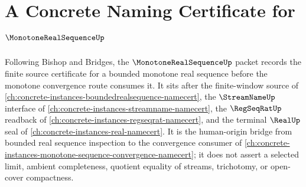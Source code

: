 \chapter{A Concrete Naming Certificate for $\MonotoneRealSequenceUp$}
\label{ch:concrete-instances-monotone-real-sequence-namecert}

Following Bishop and Bridges, the $\MonotoneRealSequenceUp$ packet records the finite source certificate for a bounded monotone real sequence before the monotone convergence route consumes it. It sits after the finite-window source of \autoref{ch:concrete-instances-boundedrealsequence-namecert}, the $\StreamNameUp$ interface of \autoref{ch:concrete-instances-streamname-namecert}, the $\RegSeqRatUp$ readback of \autoref{ch:concrete-instances-regseqrat-namecert}, and the terminal $\RealUp$ seal of \autoref{ch:concrete-instances-real-namecert}. It is the human-origin bridge from bounded real sequence inspection to the convergence consumer of \autoref{ch:concrete-instances-monotone-sequence-convergence-namecert}; it does not assert a selected limit, ambient completeness, quotient equality of streams, trichotomy, or open-cover compactness.

